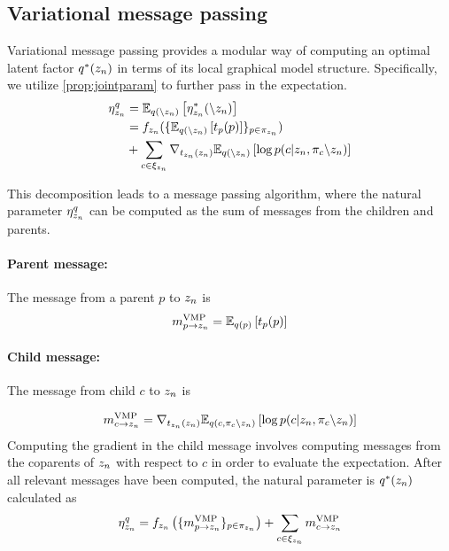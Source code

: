 \subsection{Variational message passing}

Variational message passing provides a modular way of
computing
an optimal latent factor $q^*(z_n)$
in terms of its local graphical model structure.
Specifically, we utilize \autoref{prop:jointparam}
to further pass in the expectation.
\begin{equation}
\begin{split}
    \eta^q_{z_n} &= \mathbb{E}_{q(\backslash z_n)}\left[\eta^*_{z_n}(\backslash z_n)\right] \\
                 &= f_{z_n}(\{\mathbb{E}_{q(\backslash z_n)}\left[t_p(p)\right]\}_{p \in \pi_{z_n}}) \\
                 &+ \sum_{c \in \xi_{z_n}} 
         \nabla_{t_{z_n}(z_n)} \mathbb{E}_{q(\backslash z_n)}\left[\log p(c | z_n, \pi_{c} \backslash z_n)\right]
\end{split}
\end{equation}

This decomposition leads to a message passing algorithm, where
the natural parameter $\eta^q_{z_n}$
can be computed as the sum of messages from the children and parents.
\paragraph{Parent message:}
The message from a parent $p$ to $z_n$ is
\begin{equation} \label{eq:parentmessage}
    m^{\text{VMP}}_{p \rightarrow z_n} = \mathbb{E}_{q(p)}\left[t_p(p)\right]
\end{equation}

\paragraph{Child message:}
The message from child $c$ to $z_n$ is

\begin{equation} \label{eq:childmessage}
    m^{\text{VMP}}_{c \rightarrow z_n} = \nabla_{t_{z_n}(z_n)} \mathbb{E}_{q(c, \pi_{c} \backslash z_n)}\left[\log p(c | z_n, \pi_{c} \backslash z_n)\right]
\end{equation}
Computing the gradient in the child message involves
computing messages from the coparents of $z_n$ with respect to $c$ in order to evaluate the expectation.
After all relevant messages
have been computed, the natural parameter is $q^*(z_n)$ calculated as
\begin{equation}
    \label{eq:vmpparam}
   \eta^q_{z_n} = f_{z_n}\left(\{m^{\text{VMP}}_{p \rightarrow z_n}\}_{p \in \pi_{z_n}}\right) + \sum_{c \in \xi_{z_n}} m^{\text{VMP}}_{c \rightarrow z_n}
\end{equation}

